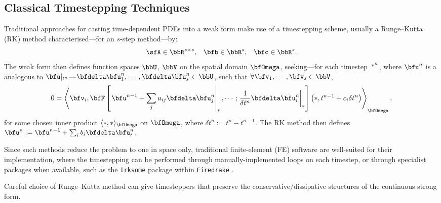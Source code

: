 \subsection*{Classical Timestepping Techniques}

    Traditional approaches for casting time-dependent PDEs into a weak form make use of a timestepping scheme, usually a Runge–Kutta (RK) method characterised—for an $s$-step method—by:
    \begin{align}
        \sfA  \in  \bbR^{s \times s},  &&
        \bfb  \in  \bbR^{s},  &&
        \bfc  \in  \bbR^{s}.
    \end{align}
    The weak form then defines function spaces $\bbU$, $\bbV$ on the spatial domain $\bfOmega$, seeking—for each timestep $*^{n}$, where $\bfu^{n}$ is a analogous to $\bfu|_{t^{n}}$—$\bfdelta\bfu^{n}_{1}, \cdots, \bfdelta\bfu^{n}_{s}  \in  \bbU$, such that $\forall  \bfv_{1}, \cdots, \bfv_{s}  \in  \bbV$,
    \begin{equation}
        0  =  \left\langle\bfv_{i}, \bfF\left[\left.\bfu^{n - 1} + \sum_{j}a_{ij}\bfdelta\bfu^{n}_{j}\right|_{*}, \cdots; \left.\frac{1}{\delta t^{n}}\bfdelta\bfu^{n}_{i}\right|_{*}\right]\left(*, t^{n - 1} + c_{i}\delta t^{n}\right)\right\rangle_{\bfOmega},
    \end{equation}
    for some chosen inner product $\langle*, *\rangle_{\bfOmega}$ on $\bfOmega$, where $\delta t^{n}  :=  t^{n} - t^{n - 1}$. The RK method then defines $\bfu^{n}  :=  \bfu^{n - 1} + \sum_{i}b_{i}\bfdelta\bfu^{n}_{i}$.
    
    \line
    \begin{example}
    \end{example} 

    \begin{example}
    \end{example}
    \line
    
    Since such methods reduce the problem to one in space only, traditional finite-element (FE) software are well-suited for their implementation, where the timestepping can be performed through manually-implemented loops on each timestep, or through specialist packages when available, such as the \texttt{Irksome} package within \texttt{Firedrake} \BA{[Ref]}.

    Careful choice of Runge–Kutta method can give timesteppers that preserve the conservative/dissipative structures of the continuous strong form.

